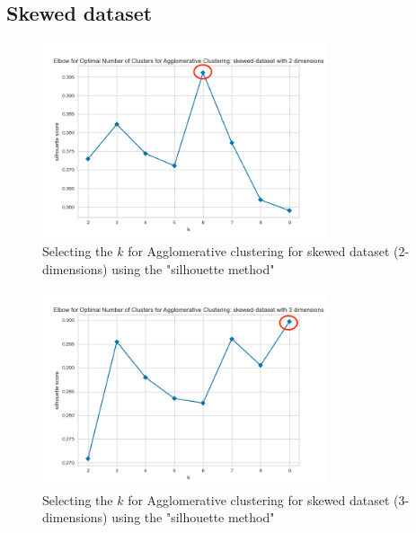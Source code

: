 \subsection{Skewed dataset}
\begin{figure}[H]
  \includegraphics[width=0.75\textwidth]{Method/images/k-values/skewed-dataset-2-agglomerative.png}
  \caption{Selecting the $k$ for Agglomerative clustering for skewed dataset (2-dimensions) using the "silhouette method"}
  \label{hyperparameters:agglomerative-skewed-dataset-2d}
\end{figure}
\begin{figure}[H]
  \includegraphics[width=0.75\textwidth]{Method/images/k-values/skewed-dataset-3-agglomerative.png}
  \caption{Selecting the $k$ for Agglomerative clustering for skewed dataset (3-dimensions) using the "silhouette method"}
  \label{hyperparameters:agglomerative-skewed-dataset-3d}
\end{figure}